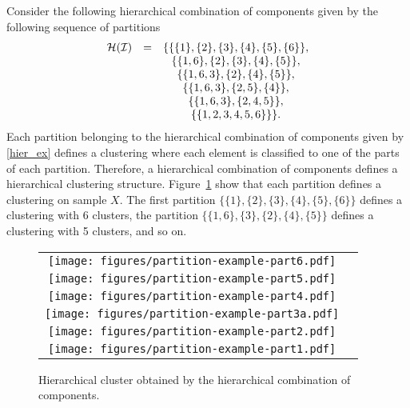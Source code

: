 \documentclass[10pt, a4paper]{article}
\begin{document}
Consider the following hierarchical combination of components given by the following sequence of partitions
\begin{equation}
\begin{array}{r c c}
\mathcal{H}(\mathcal{I}) &=& \{ \{\{1\},\{2\},\{3\},\{4\},\{5\},\{6\}\}, \\
   & & \{\{1, 6\},\{2\},\{3\},\{4\},\{5\} \}, \\
   & &    \{\{1, 6, 3\},\{2\},\{4\},\{5\} \}, \\
   & &    \{\{1, 6, 3\},\{2, 5\},\{4 \} \}, \\
    & &   \{\{1, 6, 3\},\{2, 4, 5\} \}, \\
   & &    \{\{1, 2, 3, 4, 5, 6\}\} \}.
\end{array}
\label{hier_ex}
\end{equation}
Each partition belonging to the hierarchical combination of components given by \ref{hier_ex} defines a clustering where each element is classified to one of the parts of each partition. Therefore, a hierarchical combination of components defines a hierarchical clustering structure. Figure~\ref{hierarchical} show that each partition defines a clustering on sample $X$. The first partition $\{\{1\},\{2\},\{3\},\{4\},\{5\},\{6\}\}$ defines a clustering with 6 clusters, the partition $\{\{1, 6\}, \{3\},\{2\},\{4\},\{5\} \}$ defines a clustering with 5 clusters, and so on.

\begin{figure}[thbp]
\begin{center}
\begin{tabular}{cc}
  \texttt{[image: figures/partition-example-part6.pdf]} \\
    \texttt{[image: figures/partition-example-part5.pdf]} \\
      \texttt{[image: figures/partition-example-part4.pdf]} \\
        \texttt{[image: figures/partition-example-part3a.pdf]} \\
          \texttt{[image: figures/partition-example-part2.pdf]} \\
            \texttt{[image: figures/partition-example-part1.pdf]}
 \end{tabular}
 \caption{Hierarchical cluster obtained by the hierarchical combination of components.}\label{hierarchical}
\end{center}
\end{figure}
\end{document}
